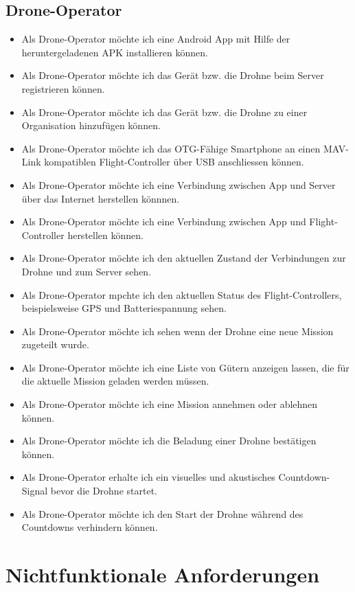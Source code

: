 \subsection{Drone-Operator}
\begin{itemize}
	\item Als Drone-Operator möchte ich eine Android App mit Hilfe der heruntergeladenen APK installieren können.
	\item Als Drone-Operator möchte ich das Gerät bzw. die Drohne beim Server registrieren können.
	\item Als Drone-Operator möchte ich das Gerät bzw. die Drohne zu einer Organisation hinzufügen können.
	\item Als Drone-Operator möchte ich das OTG-Fähige Smartphone an einen MAV-Link kompatiblen Flight-Controller über USB anschliessen können.
	\item Als Drone-Operator möchte ich eine Verbindung zwischen App und Server über das Internet herstellen könnnen.
	\item Als Drone-Operator möchte ich eine Verbindung zwischen App und Flight-Controller herstellen können.
	\item Als Drone-Operator möchte ich den aktuellen Zustand der Verbindungen zur Drohne und zum Server sehen.
	\item Als Drone-Operator mpchte ich den aktuellen Status des Flight-Controllers, beispielsweise GPS und Batteriespannung sehen.
	\item Als Drone-Operator möchte ich sehen wenn der Drohne eine neue Mission zugeteilt wurde.
	\item Als Drone-Operator möchte ich eine Liste von Gütern anzeigen lassen, die für die aktuelle Mission geladen werden müssen.
	\item Als Drone-Operator möchte ich eine Mission annehmen oder ablehnen können.
	\item Als Drone-Operator möchte ich die Beladung einer Drohne bestätigen können.
	\item Als Drone-Operator erhalte ich ein visuelles und akustisches Countdown-Signal bevor die Drohne startet.
	\item Als Drone-Operator möchte ich den Start der Drohne während des Countdowns verhindern können.
\end{itemize}


\section{Nichtfunktionale Anforderungen}

